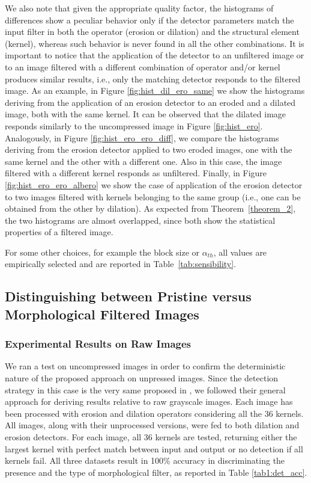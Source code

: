 \documentclass{ieeeaccess}
\begin{document}
We also note that given the appropriate quality factor, the histograms of differences show a peculiar behavior only if the detector parameters match the input filter in both the operator (erosion or dilation) and the structural element (kernel), whereas such behavior is never found in all the other combinations. It is important to notice that the application of the detector to an unfiltered image or to an image filtered with a different combination of operator and/or kernel produces similar results, i.e., only the matching detector responds to the filtered image. As an example, in Figure \ref{fig:hist_dil_ero_same} we show the histograms deriving from the application of an erosion detector to an eroded and a dilated image, both with the same kernel. It can be observed that the dilated image responds similarly to the uncompressed image in Figure \ref{fig:hist_ero}. Analogously, in Figure \ref{fig:hist_ero_ero_diff}, we compare the histograms deriving from the erosion detector applied to two eroded images, one with the same kernel and the other with a different one. Also in this case, the image filtered with a different kernel responds as unfiltered. Finally, in Figure \ref{fig:hist_ero_ero_albero} we show the case of application of the erosion detector to two images filtered with kernels belonging to the same group (i.e., one can be obtained from the other by dilation). As expected from Theorem~\ref{theorem_2}, the two histograms are almost overlapped, since both show the statistical properties of a filtered image.

For some other choices, for example the block size or $\alpha_{th}$, all values are empirically selected and are reported in Table~\ref{tab:sensibility}. 

\subsection{Distinguishing between Pristine versus Morphological Filtered Images}
\label{sec:compr_res}

\subsubsection{Experimental Results on Raw Images}

We ran a test on uncompressed images in order to confirm the deterministic nature of the proposed approach on unpressed images. Since the detection strategy in this case is the very same proposed in \cite{de2017detecting}, we followed their general approach for deriving results relative to raw grayscale images. Each image has been processed with erosion and dilation operators considering all the 36 kernels.
All images, along with their unprocessed versions, were fed to both dilation and erosion detectors. For each image, all 36 kernels are tested, returning either the largest kernel with perfect match between input and output or no detection if all kernels fail. All three datasets result in 100\% accuracy in discriminating the presence and the type of morphological filter, as reported in Table \ref{tab1:det_acc}.
\end{document}
